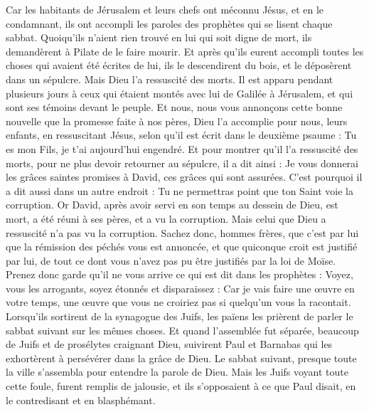 \begin{multicols}{2}
Car les habitants de Jérusalem et leurs chefs ont méconnu Jésus, et en le condamnant, ils ont accompli les paroles des prophètes qui se lisent chaque sabbat.
Quoiqu'ils n’aient rien trouvé en lui qui soit digne de mort, ils demandèrent à Pilate de le faire mourir.
Et après qu'ils eurent accompli toutes les choses qui avaient été écrites de lui, ils le descendirent du bois, et le déposèrent dans un sépulcre.
Mais Dieu l'a ressuscité des morts.
Il est apparu pendant plusieurs jours à ceux qui étaient montés avec lui de Galilée à Jérusalem, et qui sont ses témoins devant le peuple.
Et nous, nous vous annonçons cette bonne nouvelle que la promesse faite à nos pères,
Dieu l'a accomplie pour nous, leurs enfants, en ressuscitant Jésus, selon qu'il est écrit dans le deuxième psaume : Tu es mon Fils, je t'ai aujourd'hui engendré.
Et pour montrer qu'il l'a ressuscité des morts, pour ne plus devoir retourner au sépulcre, il a dit ainsi : Je vous donnerai les grâces saintes promises à David, ces grâces qui sont assurées.
C'est pourquoi il a dit aussi dans un autre endroit : Tu ne permettras point que ton Saint voie la corruption.
Or David, après avoir servi en son temps au dessein de Dieu, est mort, a été réuni à ses pères, et a vu la corruption.
Mais celui que Dieu a ressuscité n'a pas vu la corruption.
Sachez donc, hommes frères, que c'est par lui que la rémission des péchés vous est annoncée,
et que quiconque croit est justifié par lui, de tout ce dont vous n'avez pas pu être justifiés par la loi de Moïse.
Prenez donc garde qu'il ne vous arrive ce qui est dit dans les prophètes :
Voyez, vous les arrogants, soyez étonnés et disparaissez : Car je vais faire une œuvre en votre temps, une œuvre que vous ne croiriez pas si quelqu'un vous la racontait.
Lorsqu’ils sortirent de la synagogue des Juifs, les païens les prièrent de parler le sabbat suivant sur les mêmes choses.
Et quand l'assemblée fut séparée, beaucoup de Juifs et de prosélytes craignant Dieu, suivirent Paul et Barnabas qui les exhortèrent à persévérer dans la grâce de Dieu.
Le sabbat suivant, presque toute la ville s'assembla pour entendre la parole de Dieu.
Mais les Juifs voyant toute cette foule, furent remplis de jalousie, et ils s’opposaient à ce que Paul disait, en le contredisant et en blasphémant.

\end{multicols}
